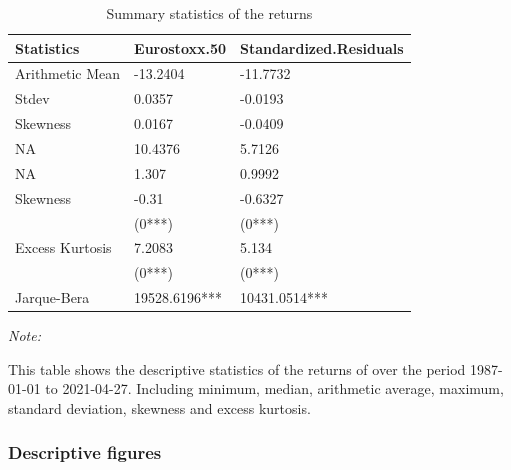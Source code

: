\documentclass[a4paper, twoside]{templates/ociamthesis}
\begin{document}
\begin{table}[h!]

\caption{\label{tab:dsTable}Summary statistics of the returns}
\centering
\begin{threeparttable}
\begin{tabular}[t]{lll}
\toprule
Statistics & Eurostoxx.50 & Standardized.Residuals\\
\midrule
Arithmetic Mean & -13.2404 & -11.7732\\
Stdev & 0.0357 & -0.0193\\
Skewness & 0.0167 & -0.0409\\
NA & 10.4376 & 5.7126\\
NA & 1.307 & 0.9992\\
\addlinespace
Skewness & -0.31 & -0.6327\\
 & (0***) & (0***)\\
Excess Kurtosis & 7.2083 & 5.134\\
 & (0***) & (0***)\\
Jarque-Bera & 19528.6196*** & 10431.0514***\\
\bottomrule
\end{tabular}
\begin{tablenotes}[para]
\item \textit{Note: } 
\item This table shows the descriptive statistics of the returns of               over the period 1987-01-01 to 2021-04-27. Including minimum, median, arithmetic average, maximum, standard deviation, skewness and excess kurtosis.
\end{tablenotes}
\end{threeparttable}
\end{table}

\newpage

\hypertarget{descriptive-figures}{%
\subsubsection{Descriptive figures}\label{descriptive-figures}}
\end{document}
